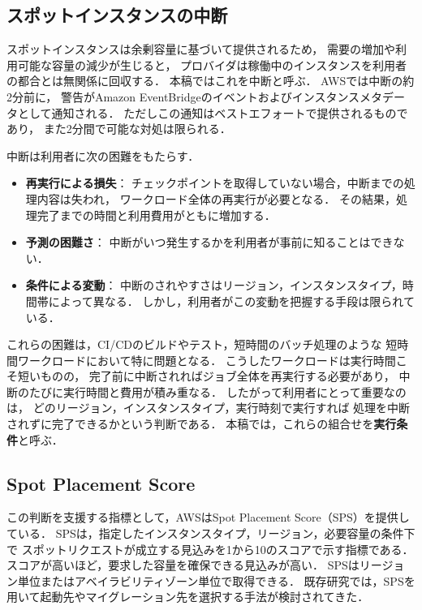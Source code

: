 \documentclass[submit,techrep,noauthor]{ipsj}
\begin{document}
\subsection{スポットインスタンスの中断}

スポットインスタンスは余剰容量に基づいて提供されるため，
需要の増加や利用可能な容量の減少が生じると，
プロバイダは稼働中のインスタンスを利用者の都合とは無関係に回収する．
本稿ではこれを中断と呼ぶ．
AWSでは中断の約2分前に，
警告がAmazon EventBridgeのイベントおよびインスタンスメタデータとして通知される\cite{AWSInterruptNotice}．
ただしこの通知はベストエフォートで提供されるものであり，
また2分間で可能な対処は限られる．

中断は利用者に次の困難をもたらす．

\begin{itemize}
\item \textbf{再実行による損失}：
チェックポイントを取得していない場合，中断までの処理内容は失われ，
ワークロード全体の再実行が必要となる．
その結果，処理完了までの時間と利用費用がともに増加する．
\item \textbf{予測の困難さ}：
中断がいつ発生するかを利用者が事前に知ることはできない．
\item \textbf{条件による変動}：
中断のされやすさはリージョン，インスタンスタイプ，時間帯によって異なる．
しかし，利用者がこの変動を把握する手段は限られている．
\end{itemize}

これらの困難は，CI/CDのビルドやテスト，短時間のバッチ処理のような
短時間ワークロードにおいて特に問題となる．
こうしたワークロードは実行時間こそ短いものの，
完了前に中断されればジョブ全体を再実行する必要があり，
中断のたびに実行時間と費用が積み重なる．
したがって利用者にとって重要なのは，
どのリージョン，インスタンスタイプ，実行時刻で実行すれば
処理を中断されずに完了できるかという判断である．
本稿では，これらの組合せを\textbf{実行条件}と呼ぶ．

\subsection{Spot Placement Score}

この判断を支援する指標として，AWSはSpot Placement Score（SPS）を提供している\cite{AWSSPS}．
SPSは，指定したインスタンスタイプ，リージョン，必要容量の条件下で
スポットリクエストが成立する見込みを1から10のスコアで示す指標である．
スコアが高いほど，要求した容量を確保できる見込みが高い．
SPSはリージョン単位またはアベイラビリティゾーン単位で取得できる．
既存研究では，SPSを用いて起動先やマイグレーション先を選択する手法が検討されてきた\cite{Katayama2022}．
\end{document}
